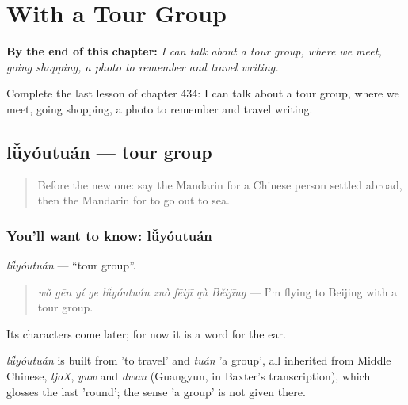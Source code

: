 
\chapter{With a Tour Group}
\label{ch:zh-with-a-tour-group}

\begin{chapteropening}
\textbf{By the end of this chapter:} \emph{I can talk about a tour group, where we meet, going shopping, a photo to remember and travel writing.}

Complete the last lesson of chapter 434: I can talk about a tour group, where we meet, going shopping, a photo to remember and travel writing.
\end{chapteropening}

\section[lǚyóutuán]{lǚyóutuán — tour group}

\label{lesson:ZH-C434-luyoutuan}



\begin{quote}
Before the new one: say the Mandarin for a Chinese person settled abroad, then the Mandarin for to go out to sea.
\end{quote}

\subsection*{You'll want to know: lǚyóutuán}
\emph{lǚyóutuán} — \textquotedblleft{}tour group\textquotedblright{}.

\begin{quote}
\emph{wǒ gēn yí ge lǚyóutuán zuò fēijī qù Běijīng} — I'm flying to Beijing with a tour group.
\end{quote}

Its characters come later; for now it is a word for the ear.

\begin{cousinweb}
\emph{lǚyóutuán} is built from  'to travel' and \emph{tuán} 'a group', all inherited from Middle Chinese, \emph{ljoX}, \emph{yuw} and \emph{dwan} (Guangyun, in Baxter's transcription), which glosses the last 'round'; the sense 'a group' is not given there.
\end{cousinweb}


